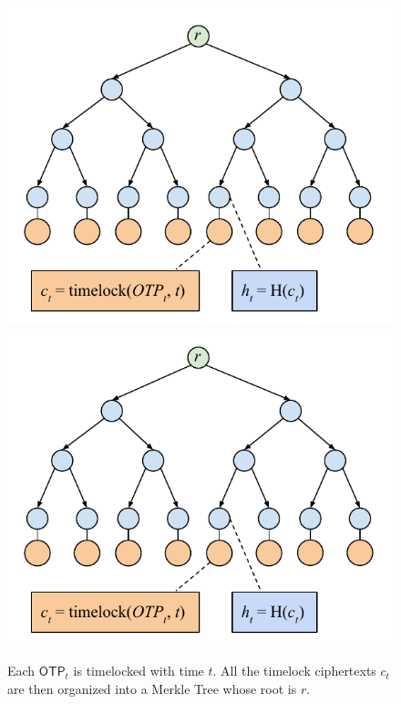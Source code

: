 \begin{figure}[H]
    \caption{Each $\textsf{OTP}_t$ is timelocked with time $t$. All the timelock
             ciphertexts $c_t$ are
             then organized into a Merkle Tree whose root is $r$.}
    \centering
    \ifccs
        \includegraphics[width=\columnwidth,keepaspectratio]{figures/timelock-merkle.pdf}
    \else
        \includegraphics[width=0.7 \columnwidth,keepaspectratio]{figures/timelock-merkle.pdf}
    \fi
    \label{fig.merkle-otp}
\end{figure}

